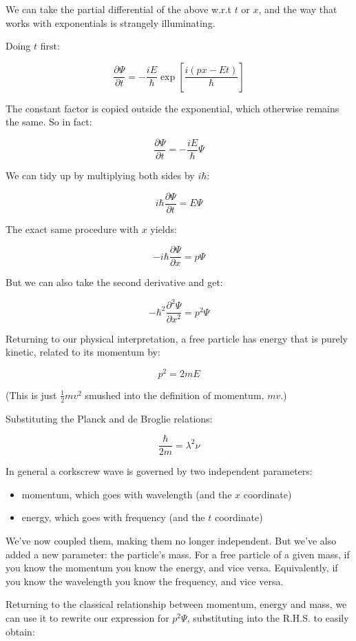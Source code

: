 We can take the partial differential of the above w.r.t $t$ or $x$, and the way that works with exponentials is strangely illuminating.

Doing $t$ first:

$$
\frac{\partial \Psi}{\partial t}
=
-\frac{iE}{\hbar}
\exp \left[ {\frac{i(px - Et)}{\hbar}} \right]
$$

The constant factor is copied outside the exponential, which otherwise remains the same. So in fact:

$$
\frac{\partial \Psi}{\partial t}
=
-\frac{iE}{\hbar}
\Psi
$$

We can tidy up by multiplying both sides by $i\hbar$:

$$
i\hbar \frac{\partial \Psi}{\partial t}
= E \Psi
$$

The exact same procedure with $x$ yields:

$$
- i\hbar \frac{\partial \Psi}{\partial x}
= p \Psi
$$

But we can also take the second derivative and get:

$$
- \hbar^2 \frac{\partial^2 \Psi}{\partial x^2}
= p^2 \Psi
$$

Returning to our physical interpretation, a free particle has energy that is purely kinetic, related to its momentum by:

$$
p^2 = 2m E
$$

(This is just $\frac{1}{2}mv^2$ smushed into the definition of momentum, $mv$.)

Substituting the Planck and de Broglie relations:

$$
\frac{\hbar}{2m} = \lambda^2\nu
$$

In general a corkscrew wave is governed by two independent parameters:

\begin{itemize}
  \item momentum, which goes with wavelength (and the $x$ coordinate)
  \item energy, which goes with frequency (and the $t$ coordinate)
\end{itemize}

We've now coupled them, making them no longer independent. But we've also added a new parameter: the particle's mass. For a free particle of a given mass, if you know the momentum you know the energy, and vice versa. Equivalently, if you know the wavelength you know the frequency, and vice versa.

Returning to the classical relationship between momentum, energy and mass, we can use it to rewrite our expression for $p^2 \Psi$, substituting into the R.H.S. to easily obtain:

